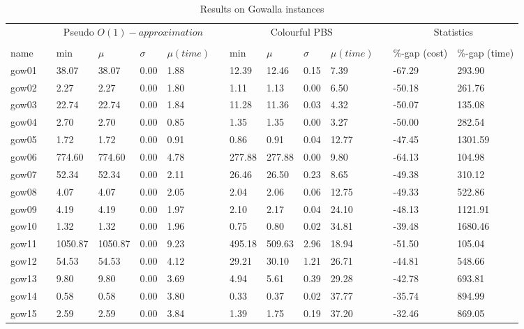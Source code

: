 \begin{table}[H]
    \caption{Results on Gowalla instances}\label{table:gowalla_cost}
    \tiny
    \begin{tabularx}{\textwidth}{llXXXXlXXXXlXX}
    \firsthline
    \multicolumn{1}{c}{Instance}& \quad & \multicolumn{4}{c}{Pseudo $O(1)-approximation$}& \quad & \multicolumn{4}{c}{Colourful PBS} & \quad & \multicolumn{2}{c}{Statistics}\\
    \cline{1-1} \cline{3-6} \cline{8-11} \cline{13-14}\\
    name && min & $\mu$ & $\sigma$ & $\mu (time)$ && min & $\mu$ & $\sigma$ & $\mu (time)$ && \%-gap (cost) & \%-gap (time)\\
    \hline
    gow01 && 38.07 & 38.07 & 0.00 & 1.88 && 12.39 & 12.46 & 0.15 & 7.39 && -67.29 & 293.90\\
    gow02 && 2.27 & 2.27 & 0.00 & 1.80 && 1.11 & 1.13 & 0.00 & 6.50 && -50.18 & 261.76\\
    gow03 && 22.74 & 22.74 & 0.00 & 1.84 && 11.28 & 11.36 & 0.03 & 4.32 && -50.07 & 135.08\\
    gow04 && 2.70 & 2.70 & 0.00 & 0.85 && 1.35 & 1.35 & 0.00 & 3.27 && -50.00 & 282.54\\
    gow05 && 1.72 & 1.72 & 0.00 & 0.91 && 0.86 & 0.91 & 0.04 & 12.77 && -47.45 & 1301.59\\
    gow06 && 774.60 & 774.60 & 0.00 & 4.78 && 277.88 & 277.88 & 0.00 & 9.80 && -64.13 & 104.98\\
    gow07 && 52.34 & 52.34 & 0.00 & 2.11 && 26.46 & 26.50 & 0.23 & 8.65 && -49.38 & 310.12\\
    gow08 && 4.07 & 4.07 & 0.00 & 2.05 && 2.04 & 2.06 & 0.06 & 12.75 && -49.33 & 522.86\\
    gow09 && 4.19 & 4.19 & 0.00 & 1.97 && 2.10 & 2.17 & 0.04 & 24.10 && -48.13 & 1121.91\\
    gow10 && 1.32 & 1.32 & 0.00 & 1.96 && 0.75 & 0.80 & 0.02 & 34.81 && -39.48 & 1680.46\\
    gow11 && 1050.87 & 1050.87 & 0.00 & 9.23 && 495.18 & 509.63 & 2.96 & 18.94 && -51.50 & 105.04\\
    gow12 && 54.53 & 54.53 & 0.00 & 4.12 && 29.21 & 30.10 & 1.21 & 26.71 && -44.81 & 548.66\\
    gow13 && 9.80 & 9.80 & 0.00 & 3.69 && 4.94 & 5.61 & 0.39 & 29.28 && -42.78 & 693.81\\
    gow14 && 0.58 & 0.58 & 0.00 & 3.80 && 0.33 & 0.37 & 0.02 & 37.77 && -35.74 & 894.99\\
    gow15 && 2.59 & 2.59 & 0.00 & 3.84 && 1.39 & 1.75 & 0.19 & 37.20 && -32.46 & 869.05\\

\end{tabularx}
\end{table}
